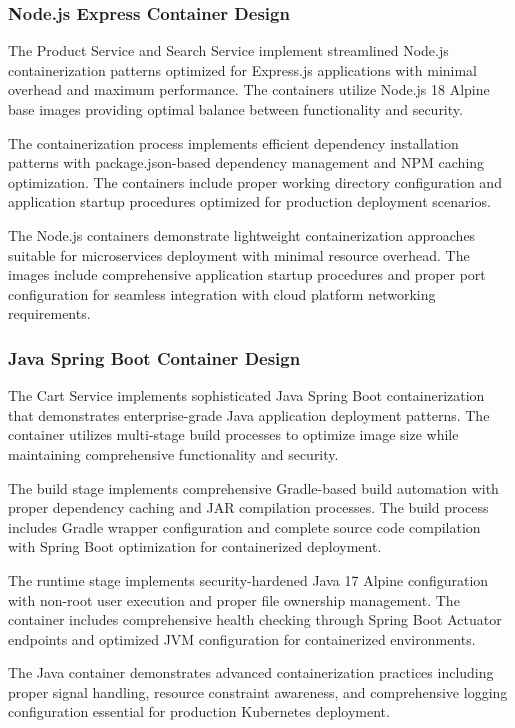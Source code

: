 \subsubsection{Node.js Express Container Design}

The Product Service and Search Service implement streamlined Node.js containerization patterns optimized for Express.js applications with minimal overhead and maximum performance. The containers utilize Node.js 18 Alpine base images providing optimal balance between functionality and security.

The containerization process implements efficient dependency installation patterns with package.json-based dependency management and NPM caching optimization. The containers include proper working directory configuration and application startup procedures optimized for production deployment scenarios.

The Node.js containers demonstrate lightweight containerization approaches suitable for microservices deployment with minimal resource overhead. The images include comprehensive application startup procedures and proper port configuration for seamless integration with cloud platform networking requirements.

\subsubsection{Java Spring Boot Container Design}

The Cart Service implements sophisticated Java Spring Boot containerization that demonstrates enterprise-grade Java application deployment patterns. The container utilizes multi-stage build processes to optimize image size while maintaining comprehensive functionality and security.

The build stage implements comprehensive Gradle-based build automation with proper dependency caching and JAR compilation processes. The build process includes Gradle wrapper configuration and complete source code compilation with Spring Boot optimization for containerized deployment.

The runtime stage implements security-hardened Java 17 Alpine configuration with non-root user execution and proper file ownership management. The container includes comprehensive health checking through Spring Boot Actuator endpoints and optimized JVM configuration for containerized environments.

The Java container demonstrates advanced containerization practices including proper signal handling, resource constraint awareness, and comprehensive logging configuration essential for production Kubernetes deployment.

